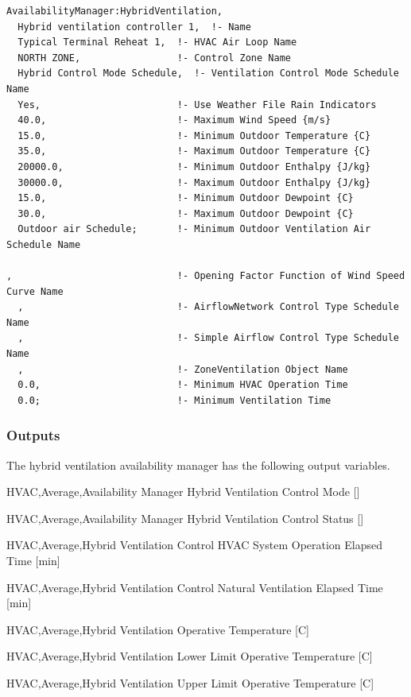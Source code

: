 \begin{lstlisting}
AvailabilityManager:HybridVentilation,
  Hybrid ventilation controller 1,  !- Name
  Typical Terminal Reheat 1,  !- HVAC Air Loop Name
  NORTH ZONE,                 !- Control Zone Name
  Hybrid Control Mode Schedule,  !- Ventilation Control Mode Schedule Name
  Yes,                        !- Use Weather File Rain Indicators
  40.0,                       !- Maximum Wind Speed {m/s}
  15.0,                       !- Minimum Outdoor Temperature {C}
  35.0,                       !- Maximum Outdoor Temperature {C}
  20000.0,                    !- Minimum Outdoor Enthalpy {J/kg}
  30000.0,                    !- Maximum Outdoor Enthalpy {J/kg}
  15.0,                       !- Minimum Outdoor Dewpoint {C}
  30.0,                       !- Maximum Outdoor Dewpoint {C}
  Outdoor air Schedule;       !- Minimum Outdoor Ventilation Air Schedule Name

,                             !- Opening Factor Function of Wind Speed Curve Name
  ,                           !- AirflowNetwork Control Type Schedule Name
  ,                           !- Simple Airflow Control Type Schedule Name
  ,                           !- ZoneVentilation Object Name
  0.0,                        !- Minimum HVAC Operation Time
  0.0;                        !- Minimum Ventilation Time
\end{lstlisting}

\subsubsection{Outputs}\label{outputs-9-008}

The hybrid ventilation availability manager has the following output variables.

HVAC,Average,Availability Manager Hybrid Ventilation Control Mode {[]}

HVAC,Average,Availability Manager Hybrid Ventilation Control Status {[]}

HVAC,Average,Hybrid Ventilation Control HVAC System Operation Elapsed Time {[min]}

HVAC,Average,Hybrid Ventilation Control Natural Ventilation Elapsed Time {[min]}

HVAC,Average,Hybrid Ventilation Operative Temperature {[C]}

HVAC,Average,Hybrid Ventilation Lower Limit Operative Temperature {[C]}

HVAC,Average,Hybrid Ventilation Upper Limit Operative Temperature {[C]}

